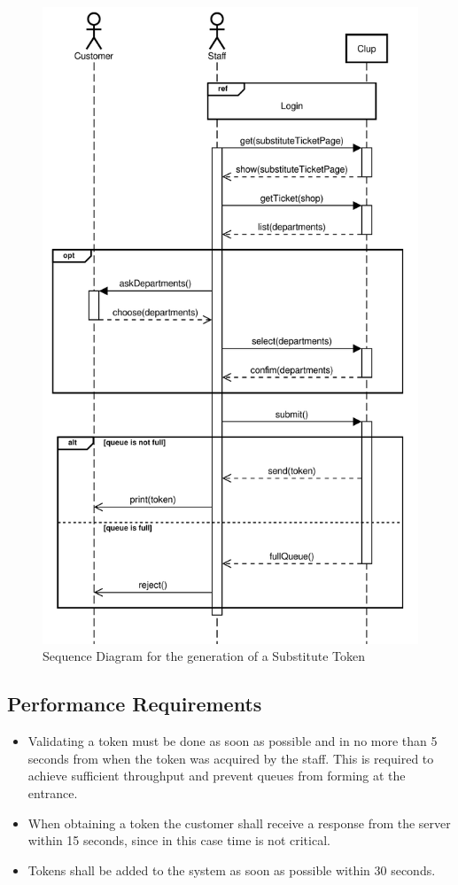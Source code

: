 \begin{figure}[H]
    \centering
    \includegraphics[scale=0.9]{Images/Sequence/substitute-ticket_sequence_straight.pdf}
    \caption{Sequence Diagram for the generation of a Substitute Token}
\end{figure}

\subsection{Performance Requirements}
\begin{itemize}
    \item Validating a token must be done as soon as possible and in no more than 5 seconds from when the token was acquired by the staff. This is required to achieve sufficient throughput and prevent queues from forming at the entrance.
    \item When obtaining a token the customer shall receive a response from the server within 15 seconds, since in this case time is not critical.
    \item Tokens shall be added to the system as soon as possible within 30 seconds.
\end{itemize}
